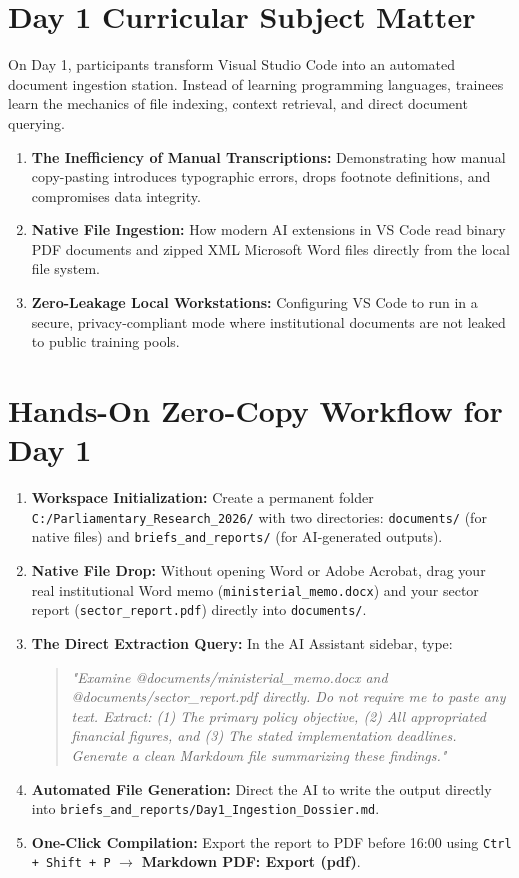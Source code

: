 \documentclass[11pt, a4paper]{report}
\begin{document}
\section{Day 1 Curricular Subject Matter}
On Day 1, participants transform Visual Studio Code into an automated document ingestion station. Instead of learning programming languages, trainees learn the mechanics of file indexing, context retrieval, and direct document querying.
\begin{enumerate}
    \item \textbf{The Inefficiency of Manual Transcriptions:} Demonstrating how manual copy-pasting introduces typographic errors, drops footnote definitions, and compromises data integrity.
    \item \textbf{Native File Ingestion:} How modern AI extensions in VS Code read binary PDF documents and zipped XML Microsoft Word files directly from the local file system.
    \item \textbf{Zero-Leakage Local Workstations:} Configuring VS Code to run in a secure, privacy-compliant mode where institutional documents are not leaked to public training pools.
\end{enumerate}

\section{Hands-On Zero-Copy Workflow for Day 1}
\begin{enumerate}[label=\textbf{Step \arabic*:}]
    \item \textbf{Workspace Initialization:} Create a permanent folder \texttt{C:/Parliamentary\_Research\_2026/} with two directories: \texttt{documents/} (for native files) and \texttt{briefs\_and\_reports/} (for AI-generated outputs).
    \item \textbf{Native File Drop:} Without opening Word or Adobe Acrobat, drag your real institutional Word memo (\texttt{ministerial\_memo.docx}) and your sector report (\texttt{sector\_report.pdf}) directly into \texttt{documents/}.
    \item \textbf{The Direct Extraction Query:} In the AI Assistant sidebar, type:
    \begin{quote}
        \small\textit{"Examine @documents/ministerial\_memo.docx and @documents/sector\_report.pdf directly. Do not require me to paste any text. Extract: (1) The primary policy objective, (2) All appropriated financial figures, and (3) The stated implementation deadlines. Generate a clean Markdown file summarizing these findings."}
    \end{quote}
    \item \textbf{Automated File Generation:} Direct the AI to write the output directly into \texttt{briefs\_and\_reports/Day1\_Ingestion\_Dossier.md}.
    \item \textbf{One-Click Compilation:} Export the report to PDF before 16:00 using \texttt{Ctrl + Shift + P} $\rightarrow$ \textbf{Markdown PDF: Export (pdf)}.
\end{enumerate}
\end{document}
